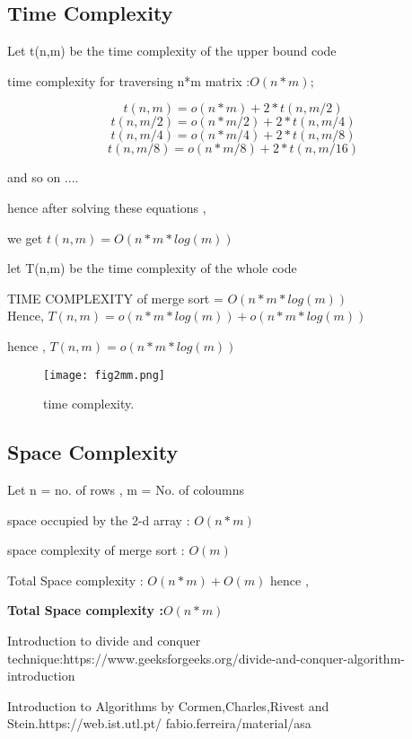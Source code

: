 \documentclass[conference]{IEEEtran}
\begin{document}
\subsection{Time Complexity}
Let t(n,m) be the time complexity of the upper bound code 

time complexity for traversing n*m matrix :$O(n*m);$



$$t(n,m) = o(n*m) + 2*t(n,m/2)$$
$$t(n,m/2) = o(n*m/2) + 2*t(n,m/4)$$
$$t(n,m/4) = o(n*m/4) + 2*t(n,m/8)$$
$$t(n,m/8) = o(n*m/8) + 2*t(n,m/16)$$

 and so on ....
 
hence after solving these equations ,
 
we get $t(n,m) = O(n*m*log(m))$

let T(n,m) be the time complexity of the whole code  
 
TIME COMPLEXITY of merge sort = $O(n*m*log(m))$\\

 Hence,
$T(n,m) = o(n*m*log(m)) + o(n*m*log(m)) $

hence ,   $ T(n,m) = o(n*m*log(m))$

\begin{figure}[h!]
\centerline{\texttt{[image: fig2mm.png]}}
\caption{time complexity.}
\label{fig2}
\end{figure}


\subsection{Space Complexity}


Let n = no. of rows , m = No. of coloumns 

space occupied by the 2-d array : $O(n*m)$ 

space complexity of merge sort : $O(m)$

Total Space complexity : $O(n*m) + O(m)$ hence , 

\textbf{Total Space complexity :$ O(n*m)$}






\begin{thebibliography}{00}
 Introduction to divide and conquer technique:https://www.geeksforgeeks.org/divide-and-conquer-algorithm-introduction

 Introduction to Algorithms by Cormen,Charles,Rivest and Stein.https://web.ist.utl.pt/ fabio.ferreira/material/asa


\end{thebibliography}
\vspace{12pt}
\end{document}
